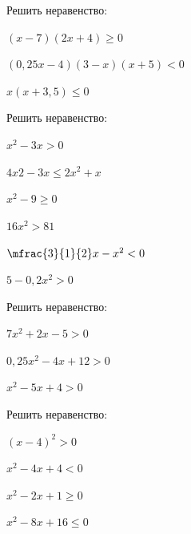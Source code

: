 \begin{consultation}
	\begin{listofex}
		\item Решить неравенство:
		\begin{enumcols}[itemcolumns=2]
			\item \( (x-7)(2x+4)\ge0 \)
			\item \( (0,25x-4)(3-x)(x+5)<0 \)
			\item \( x(x+3,5)\le0 \)
		\end{enumcols}
		\item Решить неравенство:
		\begin{enumcols}[itemcolumns=2]
			\item \( x^2-3x>0 \)
			\item \( 4x2-3x\le2x^2+x\)
			\item \( x^2-9\ge0 \)
			\item \( 16x^2>81 \)
			\item \( \mfrac{3}{1}{2}x-x^2<0 \)
			\item \( 5-0,2x^2>0 \)
		\end{enumcols}
		\item Решить неравенство:
		\begin{enumcols}[itemcolumns=2]
			\item {}
			\item \( 7x^2+2x-5>0 \)
			\item \( 0,25x^2-4x+12>0 \)
			\item \( x^2-5x+4>0 \)
		\end{enumcols}
		\item Решить неравенство:
		\begin{enumcols}[itemcolumns=2]
			\item \( (x-4)^2>0\)
			\item \( x^2-4x+4<0 \)
			\item \( x^2-2x+1\ge0 \)
			\item \( x^2-8x+16\le0 \)
		\end{enumcols}
	\end{listofex}
\end{consultation}